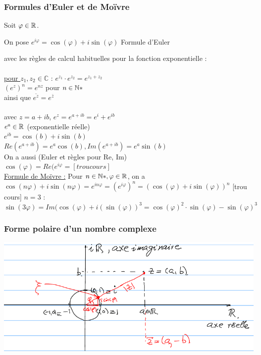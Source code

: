 \documentclass[12pt,a4paper]{article}
\begin{document}
{\subsubsection{Formules d'Euler et de Moïvre}
Soit $\varphi \in \mathbb{R}$. 
\begin{boite}[0.65]
On pose $e^{i\varphi} = \cos(\varphi) + i \sin(\varphi)$ Formule d'Euler
\end{boite}
avec les règles de calcul habituelles pour la fonction exponentielle :\\
\\
\underline{pour $z_1, z_2 \in \mathbb{C}$} : $e^{z_1} \cdot e^{z_2} = e^{z_1+z_2}$\\
$(e^z)^n = e^{nz}$ pour $n \in \mathbb{N}*$\\
ainsi que $\overline{e^z} = e^{\overline{z}}$\\
\\
avec $z = a +ib$, $e^z = e^{a+ib} = e^i + e^{ib}$\\
$e^a \in \mathbb{R}$ (exponentielle réelle)\\
$e^{ib} = \cos(b) + i\sin(b)$\\
$Re(e^{a+ib}) = e^a\cos(b ), Im(e^{a+ib}) = e^a\sin(b)$\\
On a aussi (Euler et règles pour Re, Im)\\
$\cos(\varphi) = Re(e^{i\varphi} = [trou cours]$\\
\underline{Formule de Moïvre :}
Pour $n \in \mathbb{N}*, \varphi \in \mathbb{R}$, on a\\
$\cos(n\varphi) + i\sin(n\varphi) = e^{i n \varphi} = (e^{i\varphi})^n = (\cos(\varphi) + i\sin(\varphi))^n$
[trou cours]
$n = 3$ : $\sin(3\varphi) = Im(\cos(\varphi) + i(\sin(\varphi))^3 = \cos(\varphi)^2\cdot \sin(\varphi) - \sin(\varphi)^3$
\subsubsection{Forme polaire d'un nombre complexe}
\includegraphics[scale=0.5]{illustrations_Analyse/cercle_polaire}

}
\end{document}
